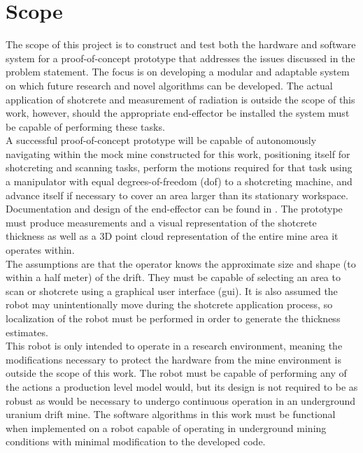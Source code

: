 \section{Scope}
\label{sec:scope}

The scope of this project is to construct and test both the hardware and software system for a proof-of-concept prototype that addresses the issues discussed in the problem statement. The focus is on developing a modular and adaptable system on which future research and novel algorithms can be developed. The actual application of shotcrete and measurement of radiation is outside the scope of this work, however, should the appropriate end-effector be installed the system must be capable of performing these tasks.\\

A successful proof-of-concept prototype will be capable of autonomously navigating within the mock mine constructed for this work, positioning itself for shotcreting and scanning tasks, perform the motions required for that task using a manipulator with equal degrees-of-freedom (\acrshort{dof}) to a shotcreting machine, and advance itself if necessary to cover an area larger than its stationary workspace. Documentation and design of the end-effector can be found in \cite{travis}. The prototype must produce measurements and a visual representation of the shotcrete thickness as well as a 3D point cloud representation of the entire mine area it operates within.\\

The assumptions are that the operator knows the approximate size and shape (to within a half meter) of the drift. They must be capable of selecting an area to scan or shotcrete using a graphical user interface (\acrshort{gui}). It is also assumed the robot may unintentionally move during the shotcrete application process, so localization of the robot must be performed in order to generate the thickness estimates.\\

This robot is only intended to operate in a research environment, meaning the modifications necessary to protect the hardware from the mine environment is outside the scope of this work. The robot must be capable of performing any of the actions a production level model would, but its design is not required to be as robust as would be necessary to undergo continuous operation in an underground uranium drift mine. The software algorithms in this work must be functional when implemented on a robot capable of operating in underground mining conditions with minimal modification to the developed code.\\

